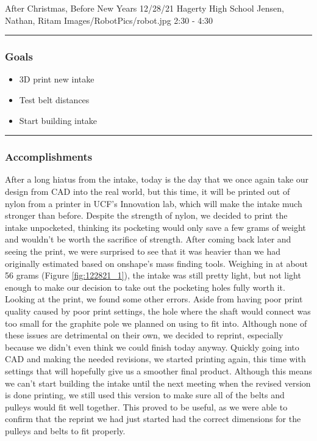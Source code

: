 \insertmeeting 
	{After Christmas, Before New Years} 
	{12/28/21} 
	{Hagerty High School}
	{Jensen, Nathan, Ritam}
	{Images/RobotPics/robot.jpg}
	{2:30 - 4:30}
	
\noindent\hfil\rule{\textwidth}{.4pt}\hfil
\subsubsection*{Goals}
\begin{itemize}
    \item 3D print new intake
    \item Test belt distances
    \item Start building intake
  

\end{itemize} 

\noindent\hfil\rule{\textwidth}{.4pt}\hfil

\subsubsection*{Accomplishments}
After a long hiatus from the intake, today is the day that we once again take our design from CAD into the real world, but this time, it will be printed out of nylon from a printer in UCF’s Innovation lab, which will make the intake much stronger than before. Despite the strength of nylon, we decided to print the intake unpocketed, thinking its pocketing would only save a few grams of weight and wouldn’t be worth the sacrifice of strength. After coming back later and seeing the print, we were surprised to see that it was heavier than we had originally estimated based on onshape’s mass finding tools. Weighing in at about 56 grams (Figure \ref{fig:122821_1}), the intake was still pretty light, but not light enough to make our decision to take out the pocketing holes fully worth it. Looking at the print, we found some other errors. Aside from having poor print quality caused by poor print settings, the hole where the shaft would connect was too small for the graphite pole we planned on using to fit into. Although none of these issues are detrimental on their own, we decided to reprint, especially because we didn’t even think we could finish today anyway. Quickly going into CAD and making the needed revisions, we started printing again, this time with settings that will hopefully give us a smoother final product. Although this means we can’t start building the intake until the next meeting when the revised version is done printing, we still used this version to make sure all of the belts and pulleys would fit well together. This proved to be useful, as we were able to confirm that the reprint we had just started had the correct dimensions for the pulleys and belts to fit properly.


